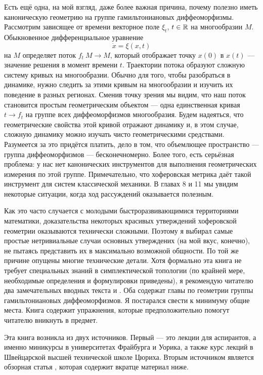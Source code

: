 Есть ещё одна, на мой взгляд, даже более важная причина, почему полезно иметь каноническую геометрию на группе гамильтониановых диффеоморфизмы.
Рассмотрим зависящее от времени векторное поле $\xi_t$, $t\in \mathbb{R}$ на многообразии $M$.
Обыкновенное дифференциальное уравнение
\[\dot x=\xi(x,t)\]
на $M$ определяет поток $f_t\: M \to M$, который отображает точку $x(0)$ в $x(t)$ --- значение решения в момент времени $t$.
Траектории потока образуют сложную систему кривых на многообразии.
Обычно для того, чтобы разобраться в динамике, нужно следить за этими кривым на многообразии и изучить их поведение в разных регионах.
Сменив точку зрения мы видим, что наш поток становится простым геометрическим объектом --- одна единственная кривая $t \to f_t$ на группе всех диффеоморфизмов многообразия.
Будем надеяться, что геометрические свойства этой кривой отражают динамику и, в этом случае, сложную динамику можно изучать чисто геометрическими средствами.
Разумеется за это придётся платить, дело в том, что объемлющее пространство --- группа
диффеоморфизмов --- бесконечномерно.
Более того, есть серьёзная проблема:
у нас нет канонических инструментов для выполнения геометрических измерения по этой группе.
Примечательно, что хоферовская метрика даёт такой инструмент для систем классической механики.
В главах 8 и 11 мы увидим некоторые ситуации, когда ход рассуждений оказывается полезным.

Как это часто случается с молодыми быстроразвивающимися территориями математики, доказательства некоторых красивых утверждений хоферовской геометрии оказываются технически сложными.
Поэтому я выбирал самые простые нетривиальные случаи основных утверждених (на мой вкус, конечно), не пытаясь представить их в максимально возможной общности.
По той же причине опущены многие технические детали.
Хотя формально эта книга не требует специальных знаний в симплектической топологии (по крайней мере, необходимые определения и формулировки приведены), я рекомендую читателю  два замечательных вводных текста \cite{HZ} и \cite{MS}.
Оба содержат главы по геометрии группы гамильтониановых диффеоморфизмов.
Я постарался свести к минимуму общие места.
Книга содержит упражнения, которые предположительно помогут читателю вникнуть в предмет.

Эта книга возникла из двух источников.
Первый --- это лекции для аспирантов, а именно миникурсы в университетах Фрайбурга и Уорика, а также курс лекций в Швейцарской высшей технической школе Цюриха.
Вторым источником является обзорная статья \cite{P8}, которая содержит вкратце материал ниже.

